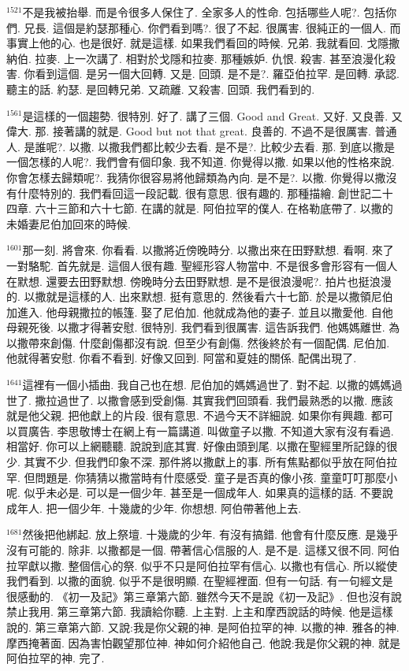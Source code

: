 \documentclass{book}
\begin{document}
$^{1521}$不是我被抬舉.
而是令很多人保住了.
全家多人的性命.
包括哪些人呢?.
包括你們.
兄長.
這個是約瑟那種心.
你們看到嗎?.
很了不起.
很厲害.
很純正的一個人.
而事實上他的心.
也是很好.
就是這樣.
如果我們看回的時候.
兄弟.
我就看回.
戈隱撒納伯.
拉麥.
上一次講了.
相對於戈隱和拉麥.
那種嫉妒.
仇恨.
殺害.
甚至浪漫化殺害.
你看到這個.
是另一個大回轉.
又是.
回頭.
是不是?.
羅亞伯拉罕.
是回轉.
承認.
聽主的話.
約瑟.
是回轉兄弟.
又疏離.
又殺害.
回頭.
我們看到的.

$^{1561}$是這樣的一個趨勢.
很特別.
好了.
講了三個.
Good and Great.
又好.
又良善.
又偉大.
那.
接著講的就是.
Good but not that great.
良善的.
不過不是很厲害.
普通人.
是誰呢?.
以撒.
以撒我們都比較少去看.
是不是?.
比較少去看.
那.
到底以撒是一個怎樣的人呢?.
我們會有個印象.
我不知道.
你覺得以撒.
如果以他的性格來說.
你會怎樣去歸類呢?.
我猜你很容易將他歸類為內向.
是不是?.
以撒.
你覺得以撒沒有什麼特別的.
我們看回這一段記載.
很有意思.
很有趣的.
那種描繪.
創世記二十四章.
六十三節和六十七節.
在講的就是.
阿伯拉罕的僕人.
在格勒底帶了.
以撒的未婚妻尼伯加回來的時候.

$^{1601}$那一刻.
將會來.
你看看.
以撒將近傍晚時分.
以撒出來在田野默想.
看啊.
來了一對駱駝.
首先就是.
這個人很有趣.
聖經形容人物當中.
不是很多會形容有一個人在默想.
還要去田野默想.
傍晚時分去田野默想.
是不是很浪漫呢?.
拍片也挺浪漫的.
以撒就是這樣的人.
出來默想.
挺有意思的.
然後看六十七節.
於是以撒領尼伯加進入.
他母親撒拉的帳篷.
娶了尼伯加.
他就成為他的妻子.
並且以撒愛他.
自他母親死後.
以撒才得著安慰.
很特別.
我們看到很厲害.
這告訴我們.
他媽媽離世.
為以撒帶來創傷.
什麼創傷都沒有說.
但至少有創傷.
然後終於有一個配偶.
尼伯加.
他就得著安慰.
你看不看到.
好像又回到.
阿當和夏娃的關係.
配偶出現了.

$^{1641}$這裡有一個小插曲.
我自己也在想.
尼伯加的媽媽過世了.
對不起.
以撒的媽媽過世了.
撒拉過世了.
以撒會感到受創傷.
其實我們回頭看.
我們最熟悉的以撒.
應該就是他父親.
把他獻上的片段.
很有意思.
不過今天不詳細說.
如果你有興趣.
都可以買廣告.
李思敬博士在網上有一篇講道.
叫做童子以撒.
不知道大家有沒有看過.
相當好.
你可以上網聽聽.
說說到底其實.
好像由頭到尾.
以撒在聖經里所記錄的很少.
其實不少.
但我們印象不深.
那件將以撒獻上的事.
所有焦點都似乎放在阿伯拉罕.
但問題是.
你猜猜以撒當時有什麼感受.
童子是否真的像小孩.
童童叮叮那麼小呢.
似乎未必是.
可以是一個少年.
甚至是一個成年人.
如果真的這樣的話.
不要說成年人.
把一個少年.
十幾歲的少年.
你想想.
阿伯帶著他上去.

$^{1681}$然後把他綁起.
放上祭壇.
十幾歲的少年.
有沒有搞錯.
他會有什麼反應.
是幾乎沒有可能的.
除非.
以撒都是一個.
帶著信心信服的人.
是不是.
這樣又很不同.
阿伯拉罕獻以撒.
整個信心的祭.
似乎不只是阿伯拉罕有信心.
以撒也有信心.
所以縱使我們看到.
以撒的面貌.
似乎不是很明顯.
在聖經裡面.
但有一句話.
有一句經文是很感動的.
《初一及記》第三章第六節.
雖然今天不是說《初一及記》.
但也沒有說禁止我用.
第三章第六節.
我讀給你聽.
上主對.
上主和摩西說話的時候.
他是這樣說的.
第三章第六節.
又說:我是你父親的神.
是阿伯拉罕的神.
以撒的神.
雅各的神.
摩西掩著面.
因為害怕觀望那位神.
神如何介紹他自己.
他說:我是你父親的神.
就是阿伯拉罕的神.
完了.
\end{document}
